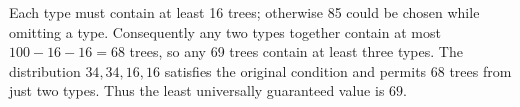 Each type must contain at least 16 trees; otherwise 85 could be chosen while omitting a type. Consequently any two types together contain at most $100-16-16=68$ trees, so any 69 trees contain at least three types. The distribution $34,34,16,16$ satisfies the original condition and permits 68 trees from just two types. Thus the least universally guaranteed value is $\boxed{69}$.
